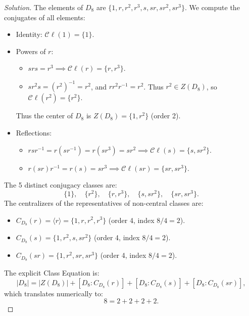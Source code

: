 \begin{proof}[Solution]
The elements of $D_8$ are $\{1, r, r^2, r^3, s, sr, sr^2, sr^3\}$.
We compute the conjugates of all elements:
\begin{itemize}[leftmargin=1.5em, itemsep=3pt]
    \item Identity: $\mathcal{C}\ell(1) = \{1\}$.
    \item Powers of $r$:
    \begin{itemize}[leftmargin=1em, itemsep=2pt]
        \item $s r s = r^3 \implies \mathcal{C}\ell(r) = \{r, r^3\}$.
        \item $s r^2 s = (r^2)^{-1} = r^2$, and $r r^2 r^{-1} = r^2$. Thus $r^2 \in Z(D_8)$, so $\mathcal{C}\ell(r^2) = \{r^2\}$.
    \end{itemize}
    Thus the center of $D_8$ is $Z(D_8) = \{1, r^2\}$ (order 2).
    \item Reflections:
    \begin{itemize}[leftmargin=1em, itemsep=2pt]
        \item $r s r^{-1} = r(sr^{-1}) = r(sr^3) = sr^2 \implies \mathcal{C}\ell(s) = \{s, sr^2\}$.
        \item $r (sr) r^{-1} = r(s) = sr^3 \implies \mathcal{C}\ell(sr) = \{sr, sr^3\}$.
    \end{itemize}
\end{itemize}
The 5 distinct conjugacy classes are:
\begin{equation*}
\{1\}, \quad \{r^2\}, \quad \{r, r^3\}, \quad \{s, sr^2\}, \quad \{sr, sr^3\}.
\end{equation*}
The centralizers of the representatives of non-central classes are:
\begin{itemize}[leftmargin=1.5em, itemsep=2pt]
    \item $C_{D_8}(r) = \langle r \rangle = \{1, r, r^2, r^3\}$ (order 4, index $8/4 = 2$).
    \item $C_{D_8}(s) = \{1, r^2, s, sr^2\}$ (order 4, index $8/4 = 2$).
    \item $C_{D_8}(sr) = \{1, r^2, sr, sr^3\}$ (order 4, index $8/4 = 2$).
\end{itemize}
The explicit Class Equation is:
\begin{equation}
|D_8| = |Z(D_8)| + [D_8 : C_{D_8}(r)] + [D_8 : C_{D_8}(s)] + [D_8 : C_{D_8}(sr)],
\end{equation}
which translates numerically to:
\begin{equation}
8 = 2 + 2 + 2 + 2.
\end{equation}
\end{proof}

